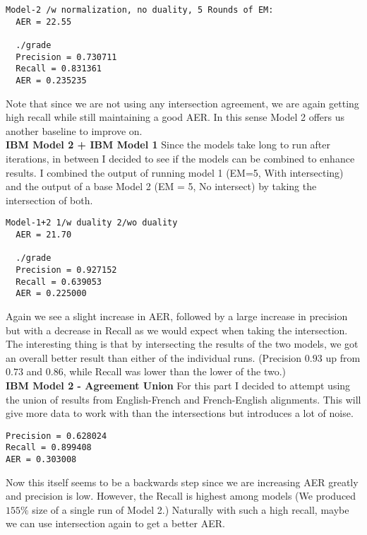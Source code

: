 \documentclass{article}
\begin{document}
\begin{verbatim}
Model-2 /w normalization, no duality, 5 Rounds of EM:
  AER = 22.55
  
  ./grade
  Precision = 0.730711
  Recall = 0.831361
  AER = 0.235235
\end{verbatim}

Note that since we are not using any intersection agreement, we are again getting high recall while still maintaining a good AER. In this sense Model 2 offers us another baseline to improve on.\\

{\bf IBM Model 2  + IBM Model 1} Since the models take long to run after iterations, in between I decided to see if the models can be combined to enhance results. I combined the output of running model 1 (EM=5, With intersecting) and the output of a base Model 2 (EM = 5, No intersect) by taking the intersection of both.

\begin{verbatim}
Model-1+2 1/w duality 2/wo duality
  AER = 21.70
  
  ./grade
  Precision = 0.927152
  Recall = 0.639053
  AER = 0.225000
\end{verbatim}

Again we see a slight increase in AER, followed by a large increase in precision but with a decrease in Recall as we would expect when taking the intersection. The interesting thing is that by intersecting the results of the two models, we got an overall better result than either of the individual runs. (Precision $0.93$ up from $0.73$ and $0.86$, while Recall was lower than the lower of the two.)\\

{\bf IBM Model 2 - Agreement Union} For this part I decided to attempt using the union of results from English-French and French-English alignments. This will give more data to work with than the intersections but introduces a lot of noise. 

\begin{verbatim}
Precision = 0.628024
Recall = 0.899408
AER = 0.303008
\end{verbatim}

Now this itself seems to be a backwards step since we are increasing AER greatly and precision is low. However, the Recall is highest among models (We produced $155\%$ size of  a single run of Model 2.) Naturally with such a high recall, maybe we can use intersection again to get a better AER. 
\end{document}
